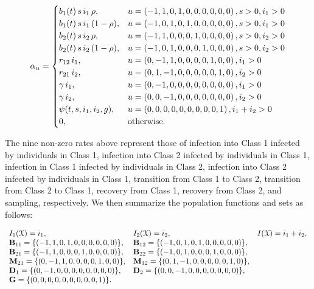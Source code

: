 \documentclass[11pt,reqno,final]{amsart}\usepackage[]{graphicx}\usepackage[]{color}
\begin{document}
\begin{equation*}
  \alpha_u =
  \begin{cases}
     b_1(t)\,s\,i_1\,\rho,        & u=\left(-1,1,0,1,0,0,0,0,0,0\right), s>0, i_1>0 \\
     b_1(t)\,s\,i_1\,(1-\rho),    & u=\left(-1,0,1,0,1,0,0,0,0,0\right), s>0, i_1>0 \\
     b_2(t)\,s\,i_2\,\rho,        & u=\left(-1,1,0,0,0,1,0,0,0,0\right), s>0, i_2>0 \\
     b_2(t)\,s\,i_2\,(1-\rho),    & u=\left(-1,0,1,0,0,0,1,0,0,0\right), s>0, i_2>0 \\
     r_{12}\,i_1,                 & u=\left(0,-1,1,0,0,0,0,1,0,0\right), i_1>0 \\
     r_{21}\,i_2,                 & u=\left(0,1,-1,0,0,0,0,0,1,0\right), i_2>0 \\
     \gamma\,i_1,                 & u=\left(0,-1,0,0,0,0,0,0,0,0\right), i_1>0 \\
     \gamma\,i_2,                 & u=\left(0,0,-1,0,0,0,0,0,0,0\right), i_2>0 \\
     \psi(t,s,i_1,i_2,g),         & u=\left(0,0, 0,0,0,0,0,0,0,1\right), i_1+i_2>0\\
    0, & \text{otherwise.}
  \end{cases}
\end{equation*}

The nine non-zero rates above represent those of infection into Class 1 infected by individuals in Class 1, infection into Class 2 infected by individuals in Class 1, infection in Class 1 infected by individuals in Class 2, infection into Class 2 infected by individuals in Class 1, transition from Class 1 to Class 2, transition from Class 2 to Class 1, recovery from Class 1, recovery from Class 2, and sampling, respectively. We then summarize the population functions and sets as follows:

\begin{align*}
\begin{array}{lll}
  I_1(\mathcal{X})=i_1,                                  & I_2(\mathcal{X})=i_2,                              & I(\mathcal{X})=i_1+i_2, \\
  \mathbf{B}_{11}=\{\left(-1,1,0,1,0,0,0,0,0,0\right)\}, & \mathbf{B}_{12}=\{\left(-1,0,1,0,1,0,0,0,0,0\right)\}, & \\
  \mathbf{B}_{21}=\{\left(-1,1,0,0,0,1,0,0,0,0\right)\}, & \mathbf{B}_{22}=\{\left(-1,0,1,0,0,0,1,0,0,0\right)\}, & \\
  \mathbf{M}_{21}=\{\left(0,-1,1,0,0,0,0,1,0,0\right)\}, & \mathbf{M}_{12}=\{\left(0,1,-1,0,0,0,0,0,1,0\right)\}, & \\
  \mathbf{D}_1=\{\left(0,-1,0,0,0,0,0,0,0,0\right)\},    & \mathbf{D}_2=\{\left(0,0,-1,0,0,0,0,0,0,0\right)\},    & \\
  \mathbf{G}=\{\left(0,0, 0,0,0,0,0,0,0,1\right)\}. & &
\end{array}
\end{align*}
\end{document}
